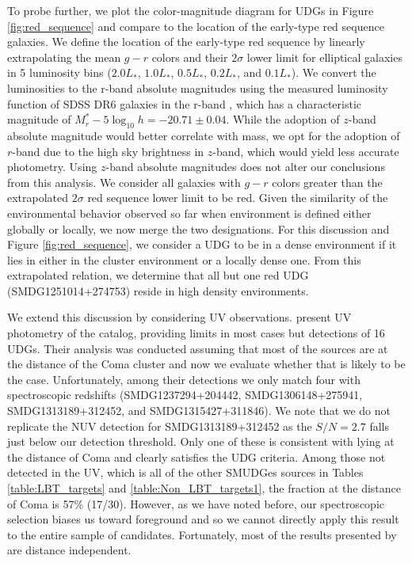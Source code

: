 \documentclass[twocolumn,tighten]{aastex63}
\begin{document}
To probe further, we plot the color-magnitude diagram for UDGs in Figure \ref{fig:red_sequence} and compare to the location of the early-type red sequence galaxies.
We define the location of the early-type red sequence by linearly extrapolating the mean $g-r$ colors and their $2\sigma$ lower limit for elliptical galaxies \citep{Schombert2016} in 5  luminosity bins ($2.0 L_*$, $1.0 L_*$, $0.5L_*$, $0.2 L_*$, and $0.1 L_*$). We convert the luminosities to the r-band absolute magnitudes using the measured luminosity function of SDSS DR6 galaxies in the r-band \citep{Montero-Dorta}, which has a characteristic magnitude of $M_r^* - 5 \log_{10} h = -20.71 \pm 0.04$.
While the adoption of $z$-band absolute magnitude would better correlate with mass, we opt for the adoption of $r$-band due to the high sky brightness in $z$-band, which would yield less accurate photometry. Using $z$-band absolute magnitudes does not alter our conclusions from this analysis.
We consider all galaxies with $g-r$ colors greater than the extrapolated $2\sigma$ red sequence lower limit to be red. Given the similarity of the environmental behavior observed so far when environment is defined either globally or locally, we now merge the two designations. For this discussion and Figure \ref{fig:red_sequence}, we consider a UDG to be in a dense environment if it lies in either in the cluster environment or a locally dense one. From this extrapolated relation, we determine that all but one red UDG (SMDG1251014+274753) reside in high density environments. 

We extend this discussion by considering UV observations.
\cite{rs} present UV photometry of the \cite{Zaritsky19} catalog, providing limits in most cases but detections of 16 UDGs. Their analysis was conducted assuming that most of the sources are at the distance of the Coma cluster and now we evaluate whether that is likely to be the case. Unfortunately, among their detections we only match four with spectroscopic redshifts
(SMDG1237294+204442, SMDG1306148+275941, SMDG1313189+312452, and SMDG1315427+311846). We note that we do not replicate the NUV detection for SMDG1313189+312452 as the $S/N=2.7$ falls just below our detection threshold. Only one of these is consistent with lying at the distance of Coma and clearly satisfies the UDG criteria. Among those not detected in the UV, which is all of the other SMUDGes sources in Tables \ref{table:LBT_targets} and \ref{table:Non_LBT_targets1}, the fraction at the distance of Coma is  57\% (17/30). However, as we have noted before, our spectroscopic selection biases us toward foreground and so we cannot directly apply this result to the entire sample of candidates. Fortunately, most of the results presented by \cite{rs} are distance independent. 
\end{document}
